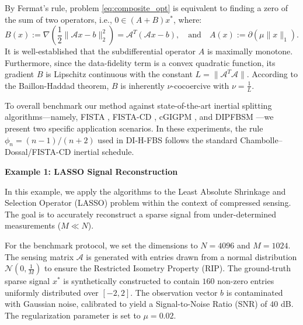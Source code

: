 \documentclass{article}
\theoremstyle{definition}
\theoremstyle{definition}
\theoremstyle{definition}
\begin{document}
By Fermat's rule, problem \eqref{eq:composite_opt} is equivalent to finding a zero of the sum of two operators, i.e., $0 \in (A+B)x^*$, where:
\begin{equation*}
B(x) := \nabla \left( \frac{1}{2}\| \mathcal{A}x - b \|_2^2 \right) = \mathcal{A}^T(\mathcal{A}x - b), \quad \text{and} \quad A(x) := \partial (\mu \|x\|_1).
\end{equation*}
It is well-established that the subdifferential operator $A$ is maximally monotone. Furthermore, since the data-fidelity term is a convex quadratic function, its gradient $B$ is Lipschitz continuous with the constant $L = \|\mathcal{A}^T \mathcal{A}\|$. According to the Baillon-Haddad theorem, $B$ is inherently $\nu$-cocoercive with $\nu = \frac{1}{L}$.

To overall benchmark our method against state-of-the-art inertial splitting algorithms---namely, FISTA \cite{beck2009fast}, FISTA-CD \cite{chambolle2015convergence}, cGIGPM \cite{wu2019general}, and DIPFBSM \cite{jolaoso2023double}---we present two specific application scenarios. In these experiments, the rule $\phi_n=(n-1)/(n+2)$ used in DI-H-FBS follows the standard Chambolle--Dossal/FISTA-CD inertial schedule.

\noindent \textbf{Example 1: LASSO Signal Reconstruction}

In this example, we apply the algorithms to the Least Absolute Shrinkage and Selection Operator (LASSO) problem within the context of compressed sensing. The goal is to accurately reconstruct a sparse signal from under-determined measurements ($M \ll N$). 

For the benchmark protocol, we set the dimensions to $N = 4096$ and $M = 1024$. The sensing matrix $\mathcal{A}$ is generated with entries drawn from a normal distribution $\mathcal{N}(0, \frac{1}{M})$ to ensure the Restricted Isometry Property (RIP). The ground-truth sparse signal $x^*$ is synthetically constructed to contain $160$ non-zero entries uniformly distributed over $[-2, 2]$. The observation vector $b$ is contaminated with Gaussian noise, calibrated to yield a Signal-to-Noise Ratio (SNR) of $40$ dB. The regularization parameter is set to $\mu = 0.02$. 
\end{document}
